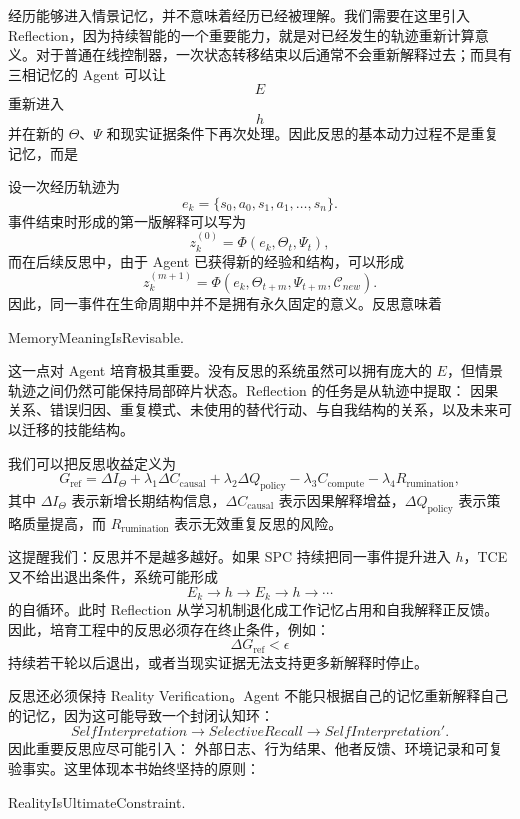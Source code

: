 经历能够进入情景记忆，并不意味着经历已经被理解。我们需要在这里引入 Reflection，因为持续智能的一个重要能力，就是对已经发生的轨迹重新计算意义。对于普通在线控制器，一次状态转移结束以后通常不会重新解释过去；而具有三相记忆的 Agent 可以让
\[
E
\]
重新进入
\[
h
\]
并在新的 $\Theta$、$\Psi$ 和现实证据条件下再次处理。因此反思的基本动力过程不是重复记忆，而是
\begin{statementbox}
\centering
{}
\end{statementbox}

设一次经历轨迹为
\[
e_k=
\{s_0,a_0,s_1,a_1,\ldots,s_n\}.
\]
事件结束时形成的第一版解释可以写为
\[
z_k^{(0)}
=
\Phi
(e_k,\Theta_t,\Psi_t),
\]
而在后续反思中，由于 Agent 已获得新的经验和结构，可以形成
\[
z_k^{(m+1)}
=
\Phi
\left(
e_k,
\Theta_{t+m},
\Psi_{t+m},
\mathcal C_{new}
\right).
\]
因此，同一事件在生命周期中并不是拥有永久固定的意义。反思意味着
\begin{statementbox}
MemoryMeaningIsRevisable.
\end{statementbox}

这一点对 Agent 培育极其重要。没有反思的系统虽然可以拥有庞大的 $E$，但情景轨迹之间仍然可能保持局部碎片状态。Reflection 的任务是从轨迹中提取：
因果关系、错误归因、重复模式、未使用的替代行动、与自我结构的关系，以及未来可以迁移的技能结构。

我们可以把反思收益定义为
\[
G_{\mathrm{ref}}
=
\Delta I_{\Theta}
+
\lambda_1\Delta C_{\mathrm{causal}}
+
\lambda_2\Delta Q_{\mathrm{policy}}
-
\lambda_3C_{\mathrm{compute}}
-
\lambda_4R_{\mathrm{rumination}},
\]
其中 $\Delta I_\Theta$ 表示新增长期结构信息，$\Delta C_{\mathrm{causal}}$ 表示因果解释增益，$\Delta Q_{\mathrm{policy}}$ 表示策略质量提高，而 $R_{\mathrm{rumination}}$ 表示无效重复反思的风险。

这提醒我们：反思并不是越多越好。如果 SPC 持续把同一事件提升进入 $h$，TCE 又不给出退出条件，系统可能形成
\[
E_k
\rightarrow
h
\rightarrow
E_k
\rightarrow
h
\rightarrow\cdots
\]
的自循环。此时 Reflection 从学习机制退化成工作记忆占用和自我解释正反馈。因此，培育工程中的反思必须存在终止条件，例如：
\[
\Delta G_{\mathrm{ref}}<\epsilon
\]
持续若干轮以后退出，或者当现实证据无法支持更多新解释时停止。

反思还必须保持 Reality Verification。Agent 不能只根据自己的记忆重新解释自己的记忆，因为这可能导致一个封闭认知环：
\[
SelfInterpretation
\rightarrow
SelectiveRecall
\rightarrow
SelfInterpretation'.
\]
因此重要反思应尽可能引入：
外部日志、行为结果、他者反馈、环境记录和可复验事实。这里体现本书始终坚持的原则：
\begin{statementbox}
RealityIsUltimateConstraint.
\end{statementbox}

